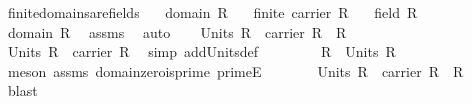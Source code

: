 \begin{isabellebody}
\endisatagproof
{\isafoldproof}%
%
\isadelimproof
\isanewline
%
\endisadelimproof
\isanewline
{}\isamarkupfalse%
\ finite{\isacharunderscore}{\kern0pt}domains{\isacharunderscore}{\kern0pt}are{\isacharunderscore}{\kern0pt}fields{\isacharcolon}{\kern0pt}\isanewline
\ \ \ {\isachardoublequoteopen}domain\ R{\isachardoublequoteclose}\isanewline
\ \ \ {\isachardoublequoteopen}finite\ {\isacharparenleft}{\kern0pt}carrier\ R{\isacharparenright}{\kern0pt}{\isachardoublequoteclose}\isanewline
\ \ \ {\isachardoublequoteopen}field\ R{\isachardoublequoteclose}\isanewline
%
\isadelimproof
%
\endisadelimproof
%
\isatagproof
{}\isamarkupfalse%
\ {\isacharminus}{\kern0pt}\isanewline
\ \ \isamarkupfalse%
\ domain\ R\ \isamarkupfalse%
\ assms\ \isamarkupfalse%
\ auto\isanewline
\ \ \isamarkupfalse%
\ {\isachardoublequoteopen}Units\ R\ {\isacharequal}{\kern0pt}\ carrier\ R\ {\isacharminus}{\kern0pt}\ {\isacharbraceleft}{\kern0pt}{\isasymzero}\isactrlbsub R\isactrlesub {\isacharbraceright}{\kern0pt}{\isachardoublequoteclose}\isanewline
\ \ \isamarkupfalse%
\ \isanewline
\ \ \ \ \isamarkupfalse%
\ {\isachardoublequoteopen}Units\ R\ {\isasymsubseteq}\ carrier\ R{\isachardoublequoteclose}\ \isamarkupfalse%
\ {\isacharparenleft}{\kern0pt}simp\ add{\isacharcolon}{\kern0pt}Units{\isacharunderscore}{\kern0pt}def{\isacharparenright}{\kern0pt}\ \isanewline
\ \ \ \ \isamarkupfalse%
\ \isamarkupfalse%
\ {\isachardoublequoteopen}{\isasymzero}\isactrlbsub R\isactrlesub \ {\isasymnotin}\ Units\ R{\isachardoublequoteclose}\isanewline
\ \ \ \ \ \ \isamarkupfalse%
\ {\isacharparenleft}{\kern0pt}meson\ assms{\isacharparenleft}{\kern0pt}{}{\isacharparenright}{\kern0pt}\ domain{\isachardot}{\kern0pt}zero{\isacharunderscore}{\kern0pt}is{\isacharunderscore}{\kern0pt}prime{\isacharparenleft}{\kern0pt}{}{\isacharparenright}{\kern0pt}\ primeE{\isacharparenright}{\kern0pt}\isanewline
\ \ \ \ \isamarkupfalse%
\ \isamarkupfalse%
\ {\isachardoublequoteopen}Units\ R\ {\isasymsubseteq}\ carrier\ R\ {\isacharminus}{\kern0pt}\ {\isacharbraceleft}{\kern0pt}{\isasymzero}\isactrlbsub R\isactrlesub {\isacharbraceright}{\kern0pt}{\isachardoublequoteclose}\ \isamarkupfalse%
\ blast\isanewline
\ \ \isamarkupfalse%
\isanewline
\ \ \ \ \isamarkupfalse%

\end{isabellebody}
